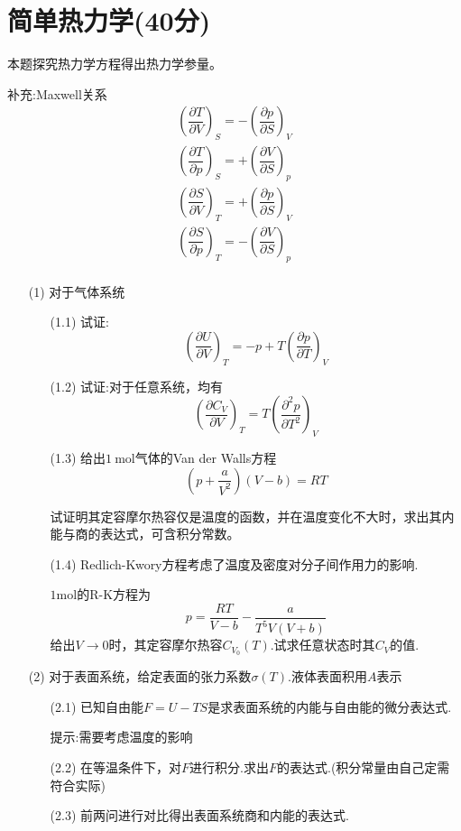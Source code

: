 \documentclass{article}
\begin{document}
\section*{简单热力学(40分)}
本题探究热力学方程得出热力学参量。\par
补充:Maxwell关系
$$
\begin{aligned}
\left( \dfrac{\partial T}{\partial V}\right) _{S}=-\left( \dfrac{\partial p}{\partial S}\right) _{V}\\
\left( \dfrac{\partial T}{\partial p}\right) _{S}=+\left( \dfrac{\partial V}{\partial S}\right) _{p}\\
\left( \dfrac{\partial S}{\partial V}\right) _{T}=+\left( \dfrac{\partial p}{\partial S}\right) _{V}\\
\left( \dfrac{\partial S}{\partial p}\right) _{T}=-\left( \dfrac{\partial V}{\partial S}\right) _{p}\\
\end{aligned}
$$
\begin{itemize}
    \item[(1)]对于气体系统
    \begin{itemize}
        \item[(1.1)]试证:$$\left(\dfrac{\partial U}{\partial V}\right)_T=-p+T \left(\dfrac{\partial p}{\partial T}\right)_V$$
        \item[(1.2)]试证:对于任意系统，均有$$\left(\dfrac{\partial C_V}{\partial V} \right)_T=T\left(\dfrac{\partial^2 p}{\partial T^2}\right)_V$$
        \item[(1.3)]给出$1\ \mathrm{mol}$气体的Van der Walls方程$$\left(p+\dfrac{a}{V^2}\right)(V-b)=RT$$\par
        试证明其定容摩尔热容仅是温度的函数，并在温度变化不大时，求出其内能与商的表达式，可含积分常数。
        \item[(1.4)]Redlich-Kwory方程考虑了温度及密度对分子间作用力的影响.\par
        $1\mathrm{mol}$的R-K方程为$$p=\dfrac{RT}{V-b}-\dfrac{a}{T^5 V(V+b)}$$
         给出$V\to 0$时，其定容摩尔热容$C_{V_0}(T)$.试求任意状态时其$C_V$的值.
    \end{itemize}
    \item[(2)] 对于表面系统，给定表面的张力系数$\sigma(T)$.液体表面积用$A$表示
    \begin{itemize}
        \item[(2.1)] 已知自由能$F=U-TS$是求表面系统的内能与自由能的微分表达式.\par 提示:需要考虑温度的影响
        \item[(2.2)] 在等温条件下，对$F$进行积分.求出$F$的表达式.(积分常量由自己定需符合实际)
        \item[(2.3)] 前两问进行对比得出表面系统商和内能的表达式.
    \end{itemize}
\end{itemize}
\end{document}
